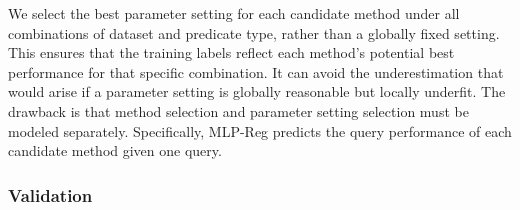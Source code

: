 We select the best parameter setting for each candidate method under all combinations of dataset and predicate type, rather than a globally fixed setting. This ensures that the training labels reflect each method's potential best performance for that specific combination. It can avoid the underestimation that would arise if a parameter setting is globally reasonable but locally underfit. The drawback is that method selection and parameter setting selection must be modeled separately. Specifically, MLP-Reg predicts the query performance of each candidate method given one query.


\subsubsection{Validation}

